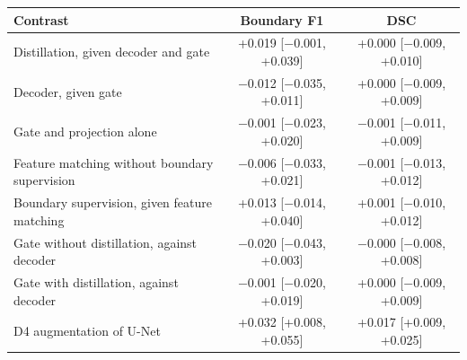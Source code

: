 \begin{tabular}{lcc}
\toprule
Contrast & Boundary F1 & DSC \\
\midrule
Distillation, given decoder and gate & +0.019 [$-$0.001, +0.039] & +0.000 [$-$0.009, +0.010] \\
Decoder, given gate & $-$0.012 [$-$0.035, +0.011] & +0.000 [$-$0.009, +0.009] \\
Gate and projection alone & $-$0.001 [$-$0.023, +0.020] & $-$0.001 [$-$0.011, +0.009] \\
Feature matching without boundary supervision & $-$0.006 [$-$0.033, +0.021] & $-$0.001 [$-$0.013, +0.012] \\
Boundary supervision, given feature matching & +0.013 [$-$0.014, +0.040] & +0.001 [$-$0.010, +0.012] \\
Gate without distillation, against decoder & $-$0.020 [$-$0.043, +0.003] & $-$0.000 [$-$0.008, +0.008] \\
Gate with distillation, against decoder & $-$0.001 [$-$0.020, +0.019] & +0.000 [$-$0.009, +0.009] \\
D4 augmentation of U-Net & +0.032 [+0.008, +0.055] & +0.017 [+0.009, +0.025] \\
\bottomrule
\end{tabular}
